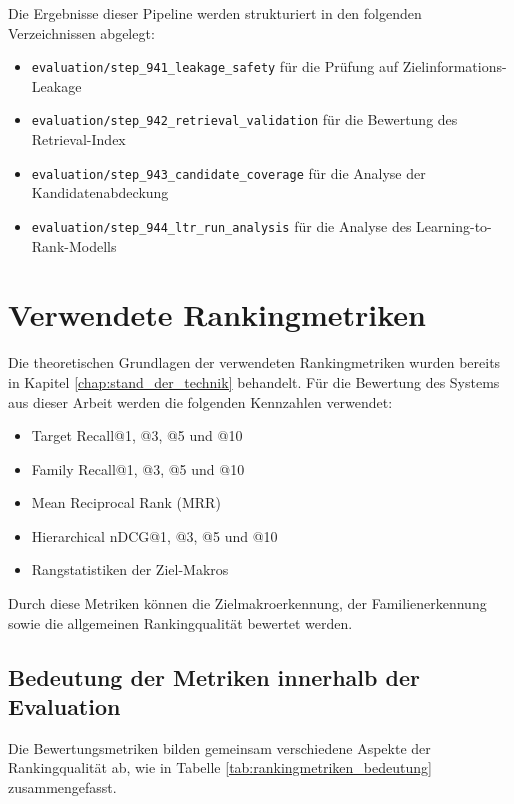 Die Ergebnisse dieser Pipeline werden strukturiert in den folgenden Verzeichnissen abgelegt:

\begin{itemize}
  \item \texttt{evaluation/step\_941\_leakage\_safety} für die Prüfung auf Zielinformations-Leakage
  \item \texttt{evaluation/step\_942\_retrieval\_validation} für die Bewertung des Retrieval-Index
  \item \texttt{evaluation/step\_943\_candidate\_coverage} für die Analyse der Kandidatenabdeckung
  \item \texttt{evaluation/step\_944\_ltr\_run\_analysis} für die Analyse des Learning-to-Rank-Modells
\end{itemize}

\section{Verwendete Rankingmetriken} 

Die theoretischen Grundlagen der verwendeten Rankingmetriken wurden bereits in Kapitel \ref{chap:stand_der_technik} behandelt. 
Für die Bewertung des Systems aus dieser Arbeit werden die folgenden Kennzahlen verwendet: 

\begin{itemize} 
  \item Target Recall@1, @3, @5 und @10 
  \item Family Recall@1, @3, @5 und @10 
  \item Mean Reciprocal Rank (MRR) 
  \item Hierarchical nDCG@1, @3, @5 und @10 
  \item Rangstatistiken der Ziel-Makros \parencite{EPLAN-Makros} 
\end{itemize} 

Durch diese Metriken können die Zielmakroerkennung, der Familienerkennung sowie die allgemeinen Rankingqualität bewertet werden.

\subsection{Bedeutung der Metriken innerhalb der Evaluation} 

Die Bewertungsmetriken bilden gemeinsam verschiedene Aspekte der Rankingqualität ab, wie in Tabelle \ref{tab:rankingmetriken_bedeutung} zusammengefasst.

